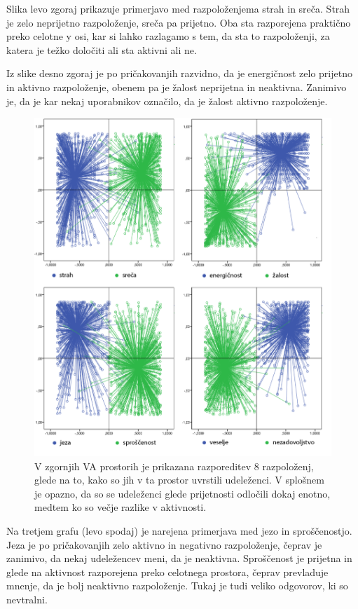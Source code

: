 \documentclass[a4paper, 12pt]{book}
\begin{document}
{Slika levo zgoraj prikazuje primerjavo med razpoloženjema strah in sreča. Strah je zelo neprijetno razpoloženje, sreča pa prijetno. Oba sta razporejena praktično preko celotne y osi, kar si lahko razlagamo s tem, da sta to razpoloženji, za katera je težko določiti ali sta aktivni ali ne. 

Iz slike desno zgoraj je po pričakovanjih razvidno, da je energičnost zelo prijetno in aktivno razpoloženje, obenem pa je žalost neprijetna in neaktivna. Zanimivo je, da je kar nekaj uporabnikov označilo, da je žalost aktivno razpoloženje.

\begin{figure}[!hbt]
\centering
\includegraphics[width=12cm]{images/vamoodlables.png}

\caption{V zgornjih VA prostorih je prikazana razporeditev 8 razpoloženj, glede na to, kako so jih v ta prostor uvrstili udeleženci. V splošnem je opazno, da so se udeleženci glede prijetnosti odločili dokaj enotno, medtem ko so večje razlike v aktivnosti.}
\label{moodperception}
\end{figure} 

Na tretjem grafu (levo spodaj) je narejena primerjava med jezo in sproščenostjo. Jeza je po pričakovanjih zelo aktivno in negativno razpoloženje, čeprav je zanimivo, da nekaj udeležencev meni, da je neaktivna. Sproščenost je prijetna in glede na aktivnost razporejena preko celotnega prostora, čeprav prevladuje mnenje, da je bolj neaktivno razpoloženje. Tukaj je tudi veliko odgovorov, ki so nevtralni.

}
\end{document}
